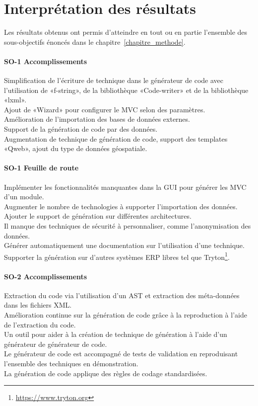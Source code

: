 \label{sec:Theme3}

\section{Interprétation des résultats}
Les résultats obtenus ont permis d’atteindre en tout ou en partie l’ensemble des sous-objectifs énoncés dans le chapitre~\ref{chapitre_methode}.%

\paragraph{SO-1 Accomplissements}
Simplification de l’écriture de technique dans le générateur de code avec l’utilisation de «f-string», de la bibliothèque «Code-writer» et de la bibliothèque «lxml».\\
Ajout de «Wizard» pour configurer le MVC selon des paramètres.\\
Amélioration de l’importation des bases de données externes.\\
Support de la génération de code par des données.\\
Augmentation de technique de génération de code, support des templates «Qweb», ajout du type de données géospatiale.

\paragraph{SO-1 Feuille de route}
Implémenter les fonctionnalités manquantes dans la GUI pour générer les MVC d’un module.\\
Augmenter le nombre de technologies à supporter l'importation des données.\\
Ajouter le support de génération sur différentes architectures.\\
Il manque des techniques de sécurité à personnaliser, comme l’anonymisation des données.\\
Générer automatiquement une documentation sur l’utilisation d’une technique. \\
Supporter la génération sur d’autres systèmes ERP libres tel que Tryton\footnote{\url{https://www.tryton.org}}.

\paragraph{SO-2 Accomplissements}
Extraction du code via l’utilisation d’un AST et extraction des méta-données dans les fichiers XML.\\
Amélioration continue sur la génération de code grâce à la reproduction à l’aide de l’extraction du code.\\
Un outil pour aider à la création de technique de génération à l’aide d’un générateur de générateur de code.\\
Le générateur de code est accompagné de tests de validation en reproduisant l’ensemble des techniques en démonstration.\\
La génération de code applique des règles de codage standardisées.

